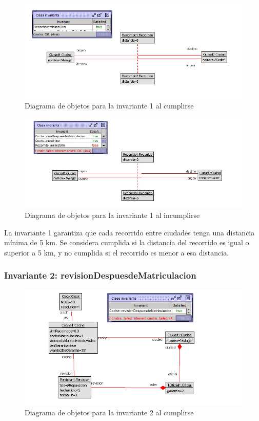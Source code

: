 \documentclass[12pt.a4paper]{article}
\begin{document}
\vspace{1.0 cm}
\begin{figure}[H]
     \includegraphics[width=1\linewidth]{Soils/1_v2.png}
     \caption{Diagrama de objetos para la invariante 1 al cumplirse}
\end{figure}

\begin{figure}[H]
     \includegraphics[width=1\linewidth]{Soils/1.jpg}
     \caption{Diagrama de objetos para la invariante 1 al incumplirse}
\end{figure}

La invariante 1 garantiza que cada recorrido entre ciudades tenga una distancia mínima de 5 km. Se considera cumplida si la distancia del recorrido es igual o superior a 5 km, y no cumplida si el recorrido es menor a esa distancia.

\subsubsection{Invariante 2: revisionDespuesdeMatriculacion}
\begin{figure}[H]
    \centering
     \includegraphics[width=0.75\linewidth]{Soils/2_v2.png}
     \caption{Diagrama de objetos para la invariante 2 al cumplirse}
\end{figure}
\end{document}
